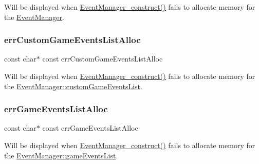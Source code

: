 Will be displayed when \hyperlink{_event_manager_8h_ab29e0486e59b74a74b8bd7832bbe573b}{Event\+Manager\+\_\+construct()} fails to allocate memory for the \hyperlink{struct_event_manager}{Event\+Manager}. \hypertarget{struct_event_manager__error_messages_a37b2753fbfa3245a819e59edc3c65161}{}\label{struct_event_manager__error_messages_a37b2753fbfa3245a819e59edc3c65161} 
\subsubsection{\texorpdfstring{err\+Custom\+Game\+Events\+List\+Alloc}{errCustomGameEventsListAlloc}}
{\footnotesize\ttfamily const char$\ast$ const err\+Custom\+Game\+Events\+List\+Alloc}

Will be displayed when \hyperlink{_event_manager_8h_ab29e0486e59b74a74b8bd7832bbe573b}{Event\+Manager\+\_\+construct()} fails to allocate memory for the \hyperlink{struct_event_manager_a72dc8ad68e1875aed6c94372ff3a51ce}{Event\+Manager\+::custom\+Game\+Events\+List}. \hypertarget{struct_event_manager__error_messages_a46f0603004a3be0585c1f4294307140e}{}\label{struct_event_manager__error_messages_a46f0603004a3be0585c1f4294307140e} 
\subsubsection{\texorpdfstring{err\+Game\+Events\+List\+Alloc}{errGameEventsListAlloc}}
{\footnotesize\ttfamily const char$\ast$ const err\+Game\+Events\+List\+Alloc}

Will be displayed when \hyperlink{_event_manager_8h_ab29e0486e59b74a74b8bd7832bbe573b}{Event\+Manager\+\_\+construct()} fails to allocate memory for the \hyperlink{struct_event_manager_aa2b0ad79c0a87b310b5adf8feaf9ffd4}{Event\+Manager\+::game\+Events\+List}. \hypertarget{struct_event_manager__error_messages_a9a9cd78acd092348d638117c5b717278}{}\label{struct_event_manager__error_messages_a9a9cd78acd092348d638117c5b717278} 
